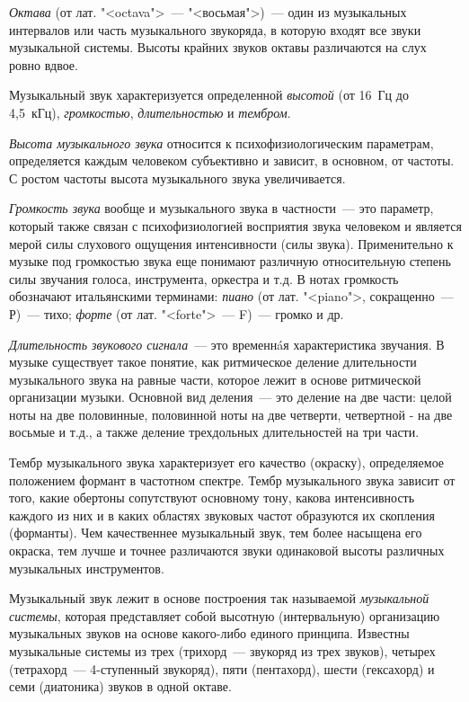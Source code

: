 \documentclass[oneside, final, 14pt]{extreport}
\begin{document}
{\itshape Октава} (от лат. "<octava">~--- "<восьмая">)~--- один из музыкальных интервалов или часть музыкального звукоряда, в которую входят все звуки музыкальной системы. Высоты крайних звуков октавы различаются на слух ровно вдвое.

Музыкальный звук характеризуется определенной {\itshape высотой} (от 16~Гц до 4,5~кГц), {\itshape громкостью}, {\itshape длительностью} и {\itshape тембром}. 

{\itshape Высота музыкального звука} относится к психофизиологическим параметрам, определяется каждым человеком субъективно и зависит, в основном, от частоты. С ростом частоты высота музыкального звука увеличивается.

{\itshape Громкость звука} вообще и музыкального звука в частности~--- это параметр, который также связан с психофизиологией восприятия звука человеком и является мерой силы слухового ощущения интенсивности (силы звука). Применительно к музыке под громкостью звука еще понимают различную относительную степень силы звучания голоса, инструмента, оркестра и т.д. В нотах громкость обозначают итальянскими терминами: {\itshape пиано} (от лат. "<piano">, сокращенно~--- Р)~--- тихо; {\itshape форте} (от лат. "<forte">~--- F)~--- громко и др.

{\itshape Длительность звукового сигнала}~--- это временн{\'a}я характеристика звучания.
В музыке существует такое понятие, как ритмическое деление длительности музыкального звука на равные части, которое лежит в основе ритмической организации музыки. Основной вид деления~--- это деление на две части: целой ноты на две половинные, половинной ноты на две четверти, четвертной - на две восьмые и т.д., а также деление трехдольных длительностей на три части.

Тембр музыкального звука характеризует его качество (окраску), определяемое положением формант в частотном спектре. Тембр музыкального звука зависит от того, какие обертоны сопутствуют основному тону, какова интенсивность каждого из них и в каких областях звуковых частот образуются их скопления (форманты). Чем качественнее музыкальный звук, тем более насыщена его окраска, тем лучше и точнее различаются звуки одинаковой высоты различных музыкальных инструментов.

Музыкальный звук лежит в основе построения так называемой {\itshape музыкальной
системы}, которая представляет собой высотную (интервальную) организацию музыкальных звуков на основе какого-либо единого принципа. Известны музыкальные системы из трех (трихорд~--- звукоряд из трех звуков), четырех (тетрахорд~--- 4-ступенный звукоряд), пяти (пентахорд), шести (гексахорд) и семи (диатоника) звуков в одной октаве. 
\end{document}
